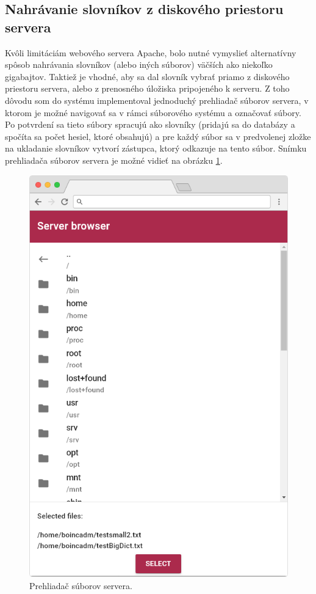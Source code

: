 \documentclass[slovak]{fitthesis}
\begin{document}
\subsection{Nahrávanie slovníkov z diskového priestoru servera}
Kvôli limitáciám webového servera Apache, bolo nutné vymyslieť alternatívny spôsob nahrávania slovníkov (alebo iných súborov) väčších ako niekoľko gigabajtov. Taktiež je vhodné, aby sa dal slovník vybrať priamo z diskového priestoru servera, alebo z prenosného úložiska pripojeného k serveru. Z toho dôvodu som do systému implementoval jednoduchý prehliadač súborov servera, v ktorom je možné navigovať sa v rámci súborového systému a označovať súbory. Po potvrdení sa tieto súbory spracujú ako slovníky (pridajú sa do databázy a spočíta sa počet hesiel, ktoré obsahujú) a pre každý súbor sa v predvolenej zložke na ukladanie slovníkov vytvorí zástupca, ktorý odkazuje na tento súbor. Snímku prehliadača súborov servera je možné vidieť na obrázku \ref{fig:serverBrowser}.
\begin{figure}[H]
    \centering
    \includegraphics[scale=0.35]{obrazky/serverBrowserFrame.PNG}
    \caption{Prehliadač súborov servera.}
    \label{fig:serverBrowser}
\end{figure}
\end{document}
